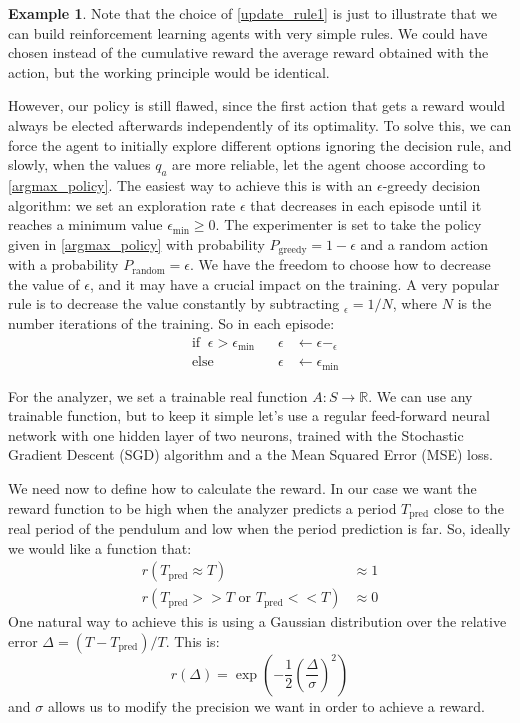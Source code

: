 \documentclass[11pt,a4paper,twoside]{report}
\newcommand{\+}{\textnormal{+} }
\theoremstyle{definition}
\newtheorem{myex}[mythm]{Example}
\numberwithin{equation}{chapter}
\begin{document}
\begin{myex}
Note that the choice of \eqref{update_rule1} is just to illustrate that we can
build reinforcement learning agents with very simple rules. We could have
chosen instead of the cumulative reward the average reward obtained with the 
action, but the working principle would be identical.

However, our policy is still flawed, since the first action that gets a reward
would always be elected afterwards independently of its optimality. To solve
this, we can force the agent to initially explore different options ignoring the
decision rule, and slowly, when the values $q_a$ are more reliable, let the
agent choose according to \eqref{argmax_policy}. The easiest way to achieve this
is with an $\epsilon$-greedy decision algorithm: we set an exploration rate
$\epsilon$ that decreases in each episode until it reaches a minimum value
$\epsilon_\text{min}\geq 0$. The experimenter is set to take the policy given in
\eqref{argmax_policy} with probability $P_{\text{greedy}}=1-\epsilon$
and a random action with a probability $P_{\text{random}}=\epsilon$. We have
the freedom to choose how to decrease the value of $\epsilon$, and it may have a
crucial impact on the training. A very popular rule is to decrease the value
constantly by subtracting $_\epsilon = 1/N$, where $N$ is the number iterations
of the training. So in each episode:
\begin{align}
  &\text{if}\; \; \epsilon > \epsilon_\text{min} \;\;\; &\epsilon&\leftarrow\epsilon - _\epsilon \\
  &\text{else} \; \;  &\epsilon &\leftarrow \epsilon_\text{min}
\end{align} 


For the analyzer, we set a trainable real function $A: S \rightarrow
\mathbb{R}$. We can use any trainable function, but to keep it simple let's use
a regular feed-forward neural network with one hidden layer of two neurons,
trained with the Stochastic Gradient Descent (SGD) algorithm and a the Mean
Squared Error (MSE) loss.

We need now to define how to calculate the reward.  In our case we want the
reward function to be high when the analyzer predicts a period $T_\text{pred}$
close to the real period of the pendulum and low when the period prediction is
far. So, ideally we would like a function that:
\begin{align}
       r(T_{\text{pred}} \approx T) &\approx 1\\
       r(T_{\text{pred}}>> T \text{ or } T_{\text{pred}} << T) & \approx 0
\end{align}
One natural way to achieve this is using a Gaussian distribution over the
relative error $\Delta=(T-T_{\text{pred}})/T$. This is:
\begin{equation}
   r(\Delta)=\exp\left(-\frac{1}{2}\left( \frac{\Delta}{\sigma} \right) ^2\right)
  \label{gaussian_reward}
\end{equation}
and $\sigma$ allows us to modify the precision we want in order to achieve a 
reward.


\end{myex}
\end{document}
